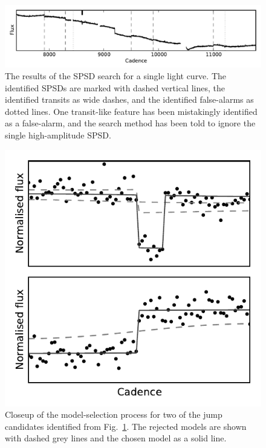 \documentclass[useAMS,usenatbib]{mn2e}
\begin{document}
\begin{figure}
 \centering
 \includegraphics[width=\textwidth]{jumps_classification.pdf}
 \caption{The results of the SPSD search for a single light curve. The identified SPSDs
  are marked with dashed vertical lines, the identified transits as wide dashes, and the
  identified false-alarms as dotted lines. One transit-like feature has been mistakingly
  identified as a false-alarm, and the search method has been told to ignore the single 
  high-amplitude SPSD.}
 \label{fig:jumps_classification}
\end{figure}

\begin{figure}
 \centering
 \includegraphics[width=\columnwidth]{jumps_classification_b.pdf}
 \caption{Closeup of the model-selection process for two of the jump candidates identified
   from Fig.~\ref{fig:jumps_classification}. The rejected models are shown with dashed
   grey lines and the chosen model as a solid line.}
 \label{fig:jumps_classification_closeup}
\end{figure}
\end{document}
